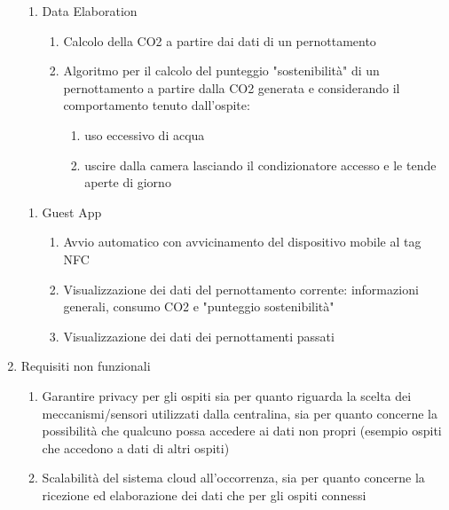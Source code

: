 \begin{enumerate}
    \begin{enumerate}
        \item Data Elaboration
        \begin{enumerate}
            \item Calcolo della CO2 a partire dai dati di un pernottamento
            \item Algoritmo per il calcolo del punteggio "sostenibilità" di un pernottamento a partire dalla CO2 generata e considerando il comportamento tenuto dall'ospite:
            \begin{enumerate}
                \item uso eccessivo di acqua
                \item uscire dalla camera lasciando il condizionatore accesso e le tende aperte di giorno  
            \end{enumerate}
        \end{enumerate}
    \end{enumerate}

    \begin{enumerate}
        \item Guest App
        \begin{enumerate}
            \item Avvio automatico con avvicinamento del dispositivo mobile al tag NFC
            \item Visualizzazione dei dati del pernottamento corrente: informazioni generali, consumo CO2 e "punteggio sostenibilità"
            \item Visualizzazione dei dati dei pernottamenti passati
        \end{enumerate}
    \end{enumerate}
    
    \item Requisiti non funzionali
    \begin{enumerate}
        \item Garantire privacy per gli ospiti sia per quanto riguarda la scelta dei meccanismi/sensori utilizzati dalla centralina, 
                sia per quanto concerne la possibilità che qualcuno possa accedere ai dati non propri (esempio ospiti che accedono a dati di altri ospiti)
        \item Scalabilità del sistema cloud all'occorrenza, sia per quanto concerne la ricezione ed elaborazione dei dati che per gli ospiti connessi
    \end{enumerate}
\end{enumerate}
